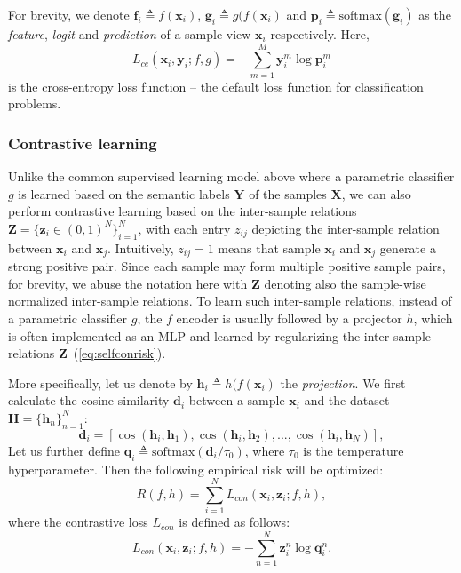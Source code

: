 \documentclass[10pt,twocolumn,letterpaper]{article}
\def\vd{{\bm{d}}}
\def\vf{{\bm{f}}}
\def\vg{{\bm{g}}}
\def\vh{{\bm{h}}}
\def\vp{{\bm{p}}}
\def\vq{{\bm{q}}}
\def\vx{{\bm{x}}}
\def\vy{{\bm{y}}}
\def\vz{{\bm{z}}}
\def\mH{{\bm{H}}}
\def\mX{{\bm{X}}}
\def\mY{{\bm{Y}}}
\def\mZ{{\bm{Z}}}
\newcommand{\softmax}{\mathrm{softmax}}
\begin{document}
For brevity, we denote $\vf_i \triangleq f(\vx_i)$, $\vg_i \triangleq g(f(\vx_i)$ and $\vp_i \triangleq \softmax(\vg_i)$ as the \textit{feature}, \textit{logit} and \textit{prediction} of a sample view $\vx_i$ respectively. Here,
\begin{equation}\label{eq:celoss}
    L_{ce}(\vx_i, \vy_i; f, g) = -\sum_{m=1}^M \vy_i^m\log \vp_i^m
\end{equation}
is the cross-entropy loss function -- the default loss function for classification problems.

\subsubsection{Contrastive learning}
Unlike the common supervised learning model above where a parametric classifier $g$ is learned based on the semantic labels $\mY$ of the samples $\mX$, we can also perform contrastive learning based on the inter-sample relations $\mZ = \{\vz_i \in (0, 1)^N\}_{i=1}^N$, with each entry $z_{ij}$ depicting the inter-sample relation between $\vx_i$ and $\vx_j$. 
Intuitively, $z_{ij} = 1$ means that sample $\vx_i$ and $\vx_j$ generate a strong positive pair. Since each sample may form multiple positive sample pairs, for brevity, we abuse the notation here with $\mZ$ denoting also the sample-wise normalized inter-sample relations.
To learn such inter-sample relations, instead of a parametric classifier $g$, the $f$ encoder is usually followed by a projector $h$, which is often implemented as an MLP and learned by regularizing the inter-sample relations $\mZ$~(\cref{eq:selfconrisk}). 

More specifically, let us denote by $\vh_i \triangleq h(f(\vx_i)$ the \textit{projection}. We first calculate the cosine similarity $\vd_i$ between a sample $\vx_i$ and the dataset $\mH = \{\vh_n\}_{n=1}^N$:
\begin{equation}\label{eq:cosinedist}
    \vd_i = [\cos(\vh_i, \vh_1), \cos(\vh_i, \vh_2),..., \cos(\vh_i, \vh_N)],
\end{equation}
Let us further define $\vq_i \triangleq \softmax(\vd_i/\tau_0)$, where $\tau_0$ is the temperature hyperparameter. Then the following empirical risk will be optimized:
\begin{equation}\label{eq:selfconrisk}
    R(f, h) = \sum_{i=1}^N L_{con}(\vx_i, \vz_i; f, h),
\end{equation}
where the contrastive loss $L_{con}$ is defined as follows:
\begin{equation}\label{eq:conloss}
    L_{con}(\vx_i, \vz_i; f, h) =  -\sum_{n=1}^N \vz_i^n\log \vq_i^n.
\end{equation}
\end{document}
